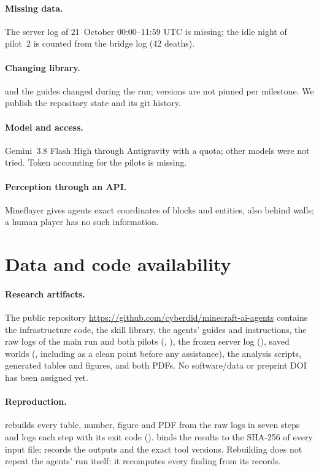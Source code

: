 \documentclass[11pt]{article}
\begin{document}
\paragraph{Missing data.} The server log of 21~October 00:00--11:59 UTC is missing; the idle night of pilot~2 is counted from the bridge log (42 deaths).
\paragraph{Changing library.}  and the guides changed during the run; versions are not pinned per milestone. We publish the repository state and its git history.
\paragraph{Model and access.} Gemini~3.8 Flash High through Antigravity with a quota; other models were not tried. Token accounting for the pilots is missing.
\paragraph{Perception through an API.} Mineflayer gives agents exact coordinates of blocks and entities, also behind walls; a human player has no such information.

\section{Data and code availability}
\paragraph{Research artifacts.} The public repository \url{https://github.com/cyberdid/minecraft-ai-agents} contains the infrastructure code, the skill library, the agents' guides and instructions, the raw logs of the main run and both pilots (, ), the frozen server log (), saved worlds (, including  as a clean point before any assistance), the analysis scripts, generated tables and figures, and both PDFs. No software/data or preprint DOI has been assigned yet.

\paragraph{Reproduction.}  rebuilds every table, number, figure and PDF from the raw logs in seven steps and logs each step with its exit code ().  binds the results to the SHA-256 of every input file;  records the outputs and  the exact tool versions. Rebuilding does not repeat the agents' run itself: it recomputes every finding from its records.
\end{document}
